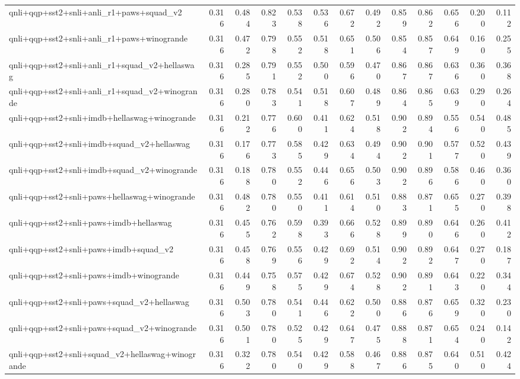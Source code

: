 \begin{table}[t]
\begin{tabular}{lrrrrrrrrrrrr}
    qnli+qqp+sst2+snli+anli\_r1+paws+squad\_v2 & 0.316 & 0.484 & 0.823 & 0.538 & 0.536 & 0.672 & 0.492 & 0.859 & 0.862 & 0.656 & 0.200 & 0.112 \\
    qnli+qqp+sst2+snli+anli\_r1+paws+winogrande & 0.316 & 0.472 & 0.798 & 0.552 & 0.518 & 0.651 & 0.506 & 0.854 & 0.857 & 0.649 & 0.160 & 0.255 \\
    qnli+qqp+sst2+snli+anli\_r1+squad\_v2+hellaswag & 0.316 & 0.285 & 0.791 & 0.552 & 0.500 & 0.596 & 0.470 & 0.867 & 0.867 & 0.636 & 0.360 & 0.368 \\
    qnli+qqp+sst2+snli+anli\_r1+squad\_v2+winogrande & 0.316 & 0.280 & 0.783 & 0.541 & 0.518 & 0.607 & 0.489 & 0.864 & 0.865 & 0.639 & 0.290 & 0.264 \\
    qnli+qqp+sst2+snli+imdb+hellaswag+winogrande & 0.316 & 0.212 & 0.776 & 0.600 & 0.411 & 0.624 & 0.518 & 0.902 & 0.894 & 0.556 & 0.540 & 0.485 \\
    qnli+qqp+sst2+snli+imdb+squad\_v2+hellaswag & 0.316 & 0.176 & 0.773 & 0.585 & 0.429 & 0.634 & 0.494 & 0.902 & 0.901 & 0.577 & 0.520 & 0.439 \\
    qnli+qqp+sst2+snli+imdb+squad\_v2+winogrande & 0.316 & 0.188 & 0.780 & 0.552 & 0.446 & 0.656 & 0.503 & 0.902 & 0.896 & 0.586 & 0.460 & 0.360 \\
    qnli+qqp+sst2+snli+paws+hellaswag+winogrande & 0.316 & 0.482 & 0.780 & 0.550 & 0.411 & 0.614 & 0.510 & 0.883 & 0.871 & 0.655 & 0.270 & 0.398 \\
    qnli+qqp+sst2+snli+paws+imdb+hellaswag & 0.316 & 0.455 & 0.762 & 0.598 & 0.393 & 0.666 & 0.528 & 0.899 & 0.890 & 0.646 & 0.260 & 0.412 \\
    qnli+qqp+sst2+snli+paws+imdb+squad\_v2 & 0.316 & 0.458 & 0.769 & 0.556 & 0.429 & 0.692 & 0.514 & 0.902 & 0.892 & 0.647 & 0.270 & 0.187 \\
    qnli+qqp+sst2+snli+paws+imdb+winogrande & 0.316 & 0.449 & 0.758 & 0.575 & 0.429 & 0.674 & 0.528 & 0.902 & 0.891 & 0.643 & 0.220 & 0.344 \\
    qnli+qqp+sst2+snli+paws+squad\_v2+hellaswag & 0.316 & 0.503 & 0.780 & 0.541 & 0.446 & 0.622 & 0.500 & 0.886 & 0.876 & 0.659 & 0.320 & 0.230 \\
    qnli+qqp+sst2+snli+paws+squad\_v2+winogrande & 0.316 & 0.501 & 0.780 & 0.525 & 0.429 & 0.647 & 0.475 & 0.888 & 0.871 & 0.654 & 0.240 & 0.142 \\
    qnli+qqp+sst2+snli+squad\_v2+hellaswag+winogrande & 0.316 & 0.322 & 0.780 & 0.540 & 0.429 & 0.588 & 0.467 & 0.886 & 0.875 & 0.640 & 0.510 & 0.424 \\

\end{tabular}
\end{table}
